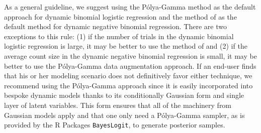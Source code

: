 \documentclass[11pt]{article}
\newcommand{\Polya}{P\'{o}lya}
\begin{document}
As a general guideline, we suggest using the \Polya-Gamma method as the default
approach for dynamic binomial logistic regression and the method of
\cite{fruhwirth-schnatter-etal-2009} as the default method for dynamic negative
binomial regression.  There are two exceptions to this rule: (1) if the number
of trials in the dynamic binomial logistic regression is large, it may be better
to use the method of \cite{fussl-etal-2013} and (2) if the average count size in
the dynamic negative binomial regression is small, it may be better to use the
\Polya-Gamma data augmentation approach.  If an end-user finds that his or her
modeling scenario does not definitively favor either technique, we recommend
using the \Polya-Gamma approach since it is easily incorporated into bespoke
dynamic models thanks to its conditionally Gaussian form and single layer of
latent variables.  This form ensures that all of the machinery from Gaussian
models apply and that one only need a \Polya-Gamma sampler, as is provided by
the R Packages \texttt{BayesLogit}, to generate posterior samples.

\appendix



\end{document}
